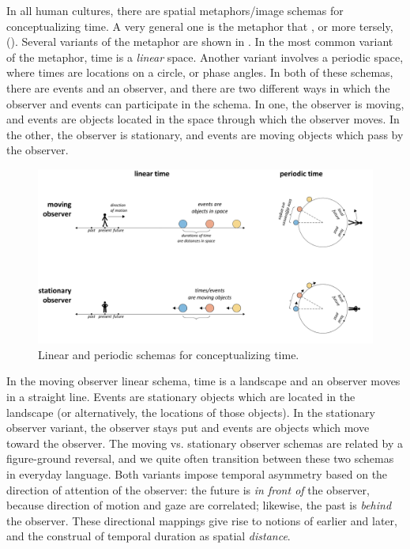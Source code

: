 In all human cultures, there are spatial metaphors/image schemas for conceptualizing time. A very general one is the metaphor that {}, or more tersely, {} (\citealt{Boroditsky2000,Boroditsky2001,CasasantoBoroditsky2008,Evans2006,GentnerEtAl2002,LakoffJohnson1999,NúñezEtAl2006}). Several variants of the metaphor are shown in {}. In the most common variant of the metaphor, time is a \textit{linear} space. Another variant involves a periodic space, where times are locations on a circle, or phase angles. In both of these schemas, there are events and an observer, and there are two different ways in which the observer and events can participate in the schema. In one, the observer is moving, and events are objects located in the space through which the observer moves. In the other, the observer is stationary, and events are moving objects which pass by the observer.

  
\begin{figure}
\includegraphics[width=\textwidth]{figures/Tilsen-img38.png}
\caption{Linear and periodic schemas for conceptualizing time.}
\label{fig:3:10}
\end{figure}
 

  In the moving observer linear schema, time is a landscape and an observer moves in a straight line. Events are stationary objects which are located in the landscape (or alternatively, the locations of those objects). In the stationary observer variant, the observer stays put and events are objects which move toward the observer. The moving vs. stationary observer schemas are related by a figure-ground reversal, and we quite often transition between these two schemas in everyday language. Both variants impose temporal asymmetry based on the direction of attention of the observer: the future is \textit{in front of} the observer, because direction of motion and gaze are correlated; likewise, the past is \textit{behind} the observer. These directional mappings give rise to notions of earlier and later, and the construal of temporal duration as spatial \textit{distance}. 

